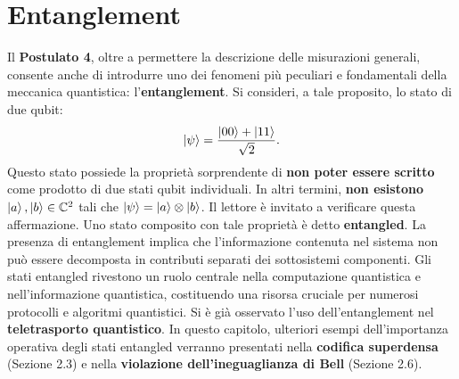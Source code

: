 \documentclass[a4paper,12pt]{report}
\theoremstyle{plain}
\begin{document}
\section*{Entanglement}
Il \textbf{Postulato 4}, oltre a permettere la descrizione delle misurazioni generali, consente anche di introdurre uno dei fenomeni più peculiari e fondamentali della meccanica quantistica: l'\textbf{entanglement}. Si consideri, a tale proposito, lo stato di due qubit:
\[
\ket{\psi} = \frac{\ket{00} + \ket{11}}{\sqrt{2}}.
\]
Questo stato possiede la proprietà sorprendente di \textbf{non poter essere scritto} come prodotto di due stati qubit individuali. In altri termini, \textbf{non esistono} $\ket{a}, \ket{b} \in \mathbb{C}^2$ tali che $\ket{\psi} = \ket{a} \otimes \ket{b}$. Il lettore è invitato a verificare questa affermazione.
Uno stato composito con tale proprietà è detto \textbf{entangled}. La presenza di entanglement implica che l'informazione contenuta nel sistema non può essere decomposta in contributi separati dei sottosistemi componenti. Gli stati entangled rivestono un ruolo centrale nella computazione quantistica e nell'informazione quantistica, costituendo una risorsa cruciale per numerosi protocolli e algoritmi quantistici.
Si è già osservato l'uso dell'entanglement nel \textbf{teletrasporto quantistico}. In questo capitolo, ulteriori esempi dell'importanza operativa degli stati entangled verranno presentati nella \textbf{codifica superdensa} (Sezione 2.3) e nella \textbf{violazione dell'ineguaglianza di Bell} (Sezione 2.6).
\end{document}

